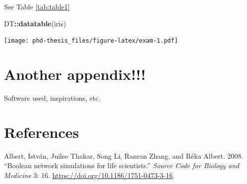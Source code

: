 \documentclass[12pt,]{book}
\newenvironment{Shaded}{\begin{snugshade}}{\end{snugshade}}
\newcommand{\KeywordTok}[1]{\textcolor[rgb]{0.13,0.29,0.53}{\textbf{#1}}}
\newcommand{\NormalTok}[1]{#1}
\newcommand{\OperatorTok}[1]{\textcolor[rgb]{0.81,0.36,0.00}{\textbf{#1}}}
\theoremstyle{definition}
\theoremstyle{definition}
\theoremstyle{definition}
\theoremstyle{remark}
\begin{document}
See Table \ref{tab:table1}

\begin{Shaded}
\begin{Highlighting}[]
\NormalTok{DT}\OperatorTok{::}\KeywordTok{datatable}\NormalTok{(iris)}
\end{Highlighting}
\end{Shaded}

\texttt{[image: phd-thesis\_files/figure-latex/exam-1.pdf]}

\hypertarget{another-appendix}{%
\chapter{Another appendix!!!}\label{another-appendix}}

Software used, inspirations, etc.

\hypertarget{references-1}{%
\chapter*{References}\label{references-1}}

\hypertarget{refs}{}
\leavevmode\hypertarget{ref-Albert2008}{}%
Albert, István, Juilee Thakar, Song Li, Ranran Zhang, and Réka Albert. 2008. ``Boolean network simulations for life scientists.'' \emph{Source Code for Biology and Medicine} 3: 16. \url{https://doi.org/10.1186/1751-0473-3-16}.
\end{document}
